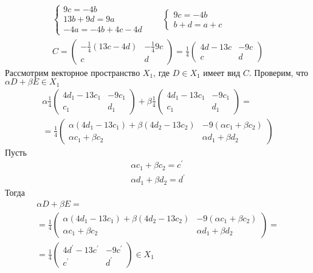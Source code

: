 \begin{gather*}
			\begin{cases}
				9c = -4b\\
				13b + 9d = 9a\\
				-4a = -4b + 4c - 4d
			\end{cases}
			\qquad
			\begin{cases}
				9c = -4b\\
				b + d = a + c
			\end{cases}
			\\
			C =
			\begin{pmatrix}
				-\frac{1}{4}(13c - 4d) & -\frac{1}{4}9c\\
				c & d
			\end{pmatrix}
			=
			\frac{1}{4}
			\begin{pmatrix}
				4d - 13c & -9c\\
				c & d
			\end{pmatrix}
		\end{gather*}
		Рассмотрим векторное пространство $X_1$, где $D \in X_1$ имеет вид $C$. Проверим, что $\alpha D + \beta E \in X_1$
		\begin{gather*}
			\alpha
			\frac{1}{4}
			\begin{pmatrix}
				4d_1 - 13c_1 & -9c_1\\
				c_1 & d_1
			\end{pmatrix}
			+ \beta
			\frac{1}{4}
			\begin{pmatrix}
				4d_1 - 13c_1 & -9c_1\\
				c_1 & d_1
			\end{pmatrix}
			= \\ =
			\frac{1}{4}
			\begin{pmatrix}
				\alpha(4d_1 - 13c_1) + \beta(4d_2 - 13c_2) & -9(\alpha c_1 + \beta c_2)\\
				\alpha c_1 + \beta c_2 & \alpha d_1 + \beta d_2
			\end{pmatrix}
		\end{gather*}
		Пусть
		\begin{gather*}
			\alpha c_1 + \beta c_2 = c^{\prime}\\
			\alpha d_1 + \beta d_2 = d^{\prime}
		\end{gather*}
		Тогда
		\begin{gather*}
			\alpha D + \beta E = \\ =
			\frac{1}{4}
			\begin{pmatrix}
			\alpha(4d_1 - 13c_1) + \beta(4d_2 - 13c_2) & -9(\alpha c_1 + \beta c_2)\\
			\alpha c_1 + \beta c_2 & \alpha d_1 + \beta d_2
			\end{pmatrix}
			= \\ =
			\frac{1}{4}
			\begin{pmatrix}
			4d^{\prime} - 13c^{\prime} & -9c^{\prime}\\
			c^{\prime} & d^{\prime}
			\end{pmatrix}
			\in X_1
		\end{gather*}
